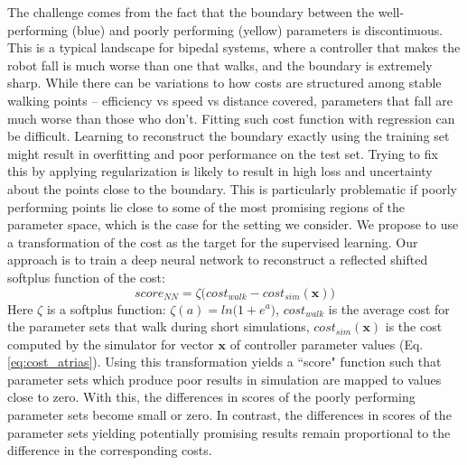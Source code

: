The challenge comes from the fact that the boundary between the well-performing (blue) and poorly performing (yellow) parameters is discontinuous. This is a typical landscape for bipedal systems, where a controller that makes the robot fall is much worse than one that walks, and the boundary is extremely sharp. While there can be variations to how costs are structured among stable walking points -- efficiency vs speed vs distance covered, parameters that fall are much worse than those who don't. Fitting such cost function with regression can be difficult. Learning to reconstruct the boundary exactly using the training set might result in overfitting and poor performance on the test set. Trying to fix this by applying regularization is likely to result in high loss and uncertainty about the points close to the boundary. This is particularly problematic if poorly performing points lie close to some of the most promising regions of the parameter space, which is the case for the setting we consider. 
We propose to use a transformation of the cost as the target for the supervised learning. Our approach is to train a deep neural network to reconstruct a reflected shifted softplus function of the cost: 
\begin{equation}
\textit{score}_{\textit{NN}} = \zeta \big( cost_{walk} - cost_{sim}(\pmb{x}) \big)
\label{eq:score_asymnn}
\end{equation}
Here $\zeta$ is a softplus function: $\zeta(a) = ln\big( 1 + e^a \big)$, $cost_{walk}$ is the average cost for the parameter sets that walk during short simulations, $cost_{sim}(\pmb{x})$ is the cost computed by the simulator for vector $\pmb{x}$ of controller parameter values (Eq. \ref{eq:cost_atrias}). Using this transformation yields a ``score" function such that parameter sets which produce poor results in simulation are mapped to values close to zero. With this, the differences in scores of the poorly performing parameter sets become small or zero. In contrast, the differences in scores of the parameter sets yielding potentially promising results remain proportional to the difference in the corresponding costs. %


